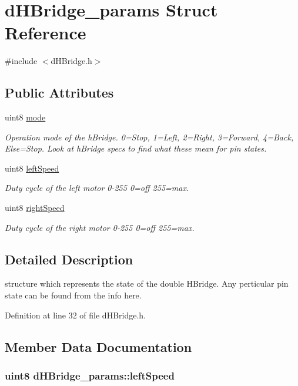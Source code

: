 \hypertarget{structd_h_bridge__params}{\section{d\-H\-Bridge\-\_\-params Struct Reference}
\label{structd_h_bridge__params}
}


{\ttfamily \#include $<$d\-H\-Bridge.\-h$>$}

\subsection*{Public Attributes}
\begin{DoxyCompactItemize}
\item 
uint8 \hyperlink{structd_h_bridge__params_aa0df512aa34374dd5f8a86b673840e52}{mode}
\begin{DoxyCompactList}\small\item\em Operation mode of the h\-Bridge. 0=Stop, 1=Left, 2=Right, 3=Forward, 4=Back, Else=Stop. Look at h\-Bridge specs to find what these mean for pin states. \end{DoxyCompactList}\item 
uint8 \hyperlink{structd_h_bridge__params_ab441c51a14ee588b109512773a2a794d}{left\-Speed}
\begin{DoxyCompactList}\small\item\em Duty cycle of the left motor 0-\/255 0=off 255=max. \end{DoxyCompactList}\item 
uint8 \hyperlink{structd_h_bridge__params_ad051173f1232b4056ec2b7c106b9385e}{right\-Speed}
\begin{DoxyCompactList}\small\item\em Duty cycle of the right motor 0-\/255 0=off 255=max. \end{DoxyCompactList}\end{DoxyCompactItemize}


\subsection{Detailed Description}
structure which represents the state of the double H\-Bridge. Any perticular pin state can be found from the info here. 

Definition at line 32 of file d\-H\-Bridge.\-h.



\subsection{Member Data Documentation}
\hypertarget{structd_h_bridge__params_ab441c51a14ee588b109512773a2a794d}{
\subsubsection[{left\-Speed}]{\setlength{\rightskip}{0pt plus 5cm}uint8 d\-H\-Bridge\-\_\-params\-::left\-Speed}}\label{structd_h_bridge__params_ab441c51a14ee588b109512773a2a794d}



